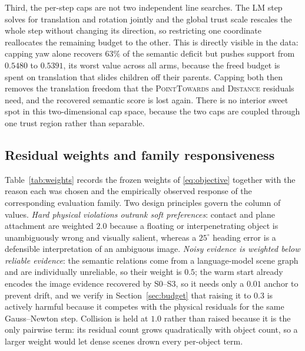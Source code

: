 \documentclass[10pt,twocolumn]{article}
\begin{document}
Third, the per-step caps are not two independent line searches.  The LM step
solves for translation and rotation jointly and the global trust scale rescales
the whole step without changing its direction, so restricting one coordinate
reallocates the remaining budget to the other.  This is directly visible in the
data: capping yaw alone recovers $63\%$ of the semantic deficit but pushes
support from $0.5480$ to $0.5391$, its worst value across all arms, because the
freed budget is spent on translation that slides children off their parents.
Capping both then removes the translation freedom that the
\textsc{PointTowards} and \textsc{Distance} residuals need, and the recovered
semantic score is lost again.  There is no interior sweet spot in this
two-dimensional cap space, because the two caps are coupled through one trust
region rather than separable.

\subsection{Residual weights and family responsiveness}
\label{sec:weights}

Table~\ref{tab:weights} records the frozen weights of \eqref{eq:objective}
together with the reason each was chosen and the empirically observed response
of the corresponding evaluation family.  Two design principles govern the
column of values.  \emph{Hard physical violations outrank soft preferences}:
contact and plane attachment are weighted $2.0$ because a floating or
interpenetrating object is unambiguously wrong and visually salient, whereas a
$25^\circ$ heading error is a defensible interpretation of an ambiguous image.
\emph{Noisy evidence is weighted below reliable evidence}: the semantic
relations come from a language-model scene graph and are individually
unreliable, so their weight is $0.5$; the warm start already encodes the image
evidence recovered by S0--S3, so it needs only a $0.01$ anchor to prevent
drift, and we verify in Section~\ref{sec:budget} that raising it to $0.3$ is
actively harmful because it competes with the physical residuals for the same
Gauss--Newton step.  Collision is held at $1.0$ rather than raised because it
is the only pairwise term: its residual count grows quadratically with object
count, so a larger weight would let dense scenes drown every per-object term.
\end{document}
